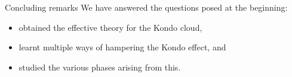 \documentclass[10pt,aspectratio=169]{beamer}
\begin{document}
\subsection{~}
\begin{frame}{Concluding remarks}
We have answered the questions posed at the beginning:\\
\vspace*{\fill}

\begin{itemize}[<+->]
	\item obtained the effective theory for the Kondo cloud,\\[10pt]
	\item learnt multiple ways of hampering the Kondo effect, and\\[10pt]
	\item studied the various phases arising from this.
\end{itemize}
\vspace*{\fill}

\hspace*{\fill}
\hspace*{\fill}
\hspace*{\fill}
\hspace*{\fill}
\end{frame}
\end{document}
